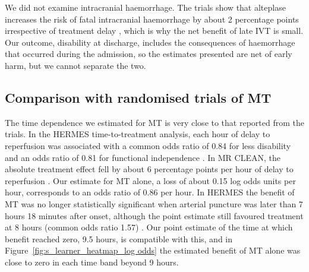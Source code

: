 We did not examine intracranial haemorrhage. The trials show that alteplase increases the risk of fatal intracranial haemorrhage by about 2 percentage points irrespective of treatment delay , which is why the net benefit of late IVT is small. Our outcome, disability at discharge, includes the consequences of haemorrhage that occurred during the admission, so the estimates presented are net of early harm, but we cannot separate the two.

\subsection{Comparison with randomised trials of MT}

The time dependence we estimated for MT is very close to that reported from the trials. In the HERMES time-to-treatment analysis, each hour of delay to reperfusion was associated with a common odds ratio of 0.84 for less disability and an odds ratio of 0.81 for functional independence . In MR CLEAN, the absolute treatment effect fell by about 6 percentage points per hour of delay to reperfusion . Our estimate for MT alone, a loss of about 0.15 log odds units per hour, corresponds to an odds ratio of 0.86 per hour. In HERMES the benefit of MT was no longer statistically significant when arterial puncture was later than 7 hours 18 minutes after onset, although the point estimate still favoured treatment at 8 hours (common odds ratio 1.57) . Our point estimate of the time at which benefit reached zero, 9.5 hours, is compatible with this, and in Figure~\ref{fig:s_learner_heatmap_log odds} the estimated benefit of MT alone was close to zero in each time band beyond 9 hours.

